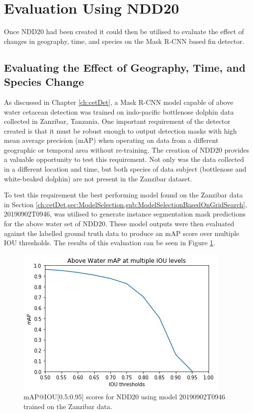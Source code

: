 \section{Evaluation Using NDD20}\label{ch:NDD,sec:EvalUsingNDD20}

Once NDD20 had been created it could then be utilised to evaluate the effect of changes in geography, time, and species on the Mask R-CNN based fin detector.

\subsection{Evaluating the Effect of Geography, Time, and Species Change}\label{ch:NDD,sec:EvalUsingNDD20,subsec:geographyTimeSpeciesChange}

As discussed in Chapter \ref{ch:cetDet}, a Mask R-CNN model capable of above water cetacean detection was trained on indo-pacific bottlenose dolphin data collected in Zanzibar, Tanzania. One important requirement of the detector created is that it must be robust enough to output detection masks with high mean average precision (mAP) when operating on data from a different geographic or temporal area without re-training. The creation of NDD20 provides a valuable opportunity to test this requirement. Not only was the data collected in a different location and time, but both species of data subject (bottlenose and white-beaked dolphin) are not present in the Zanzibar dataset.  

To test this requirement the best performing model found on the Zanzibar data in Section \ref{ch:cetDet,sec:ModelSelection,sub:ModelSelectionBasedOnGridSearch}, 20190902T0946, was utilised to generate instance segmentation mask predictions for the above water set of NDD20. These model outputs were then evaluated against the labelled ground truth data to produce an mAP score over multiple IOU thresholds. The results of this evaluation can be seen in Figure \ref{fig:aw-mAP-IOU}.

\begin{figure}
	\begin{center}
		\includegraphics[scale=0.7]{Chapter4/figs/aw-mAP-IOU.png}
	\end{center}
	\caption{mAP@IOU[0.5:0.95] scores for NDD20 using model 20190902T0946 trained on the Zanzibar data.}
	\label{fig:aw-mAP-IOU}
\end{figure}

